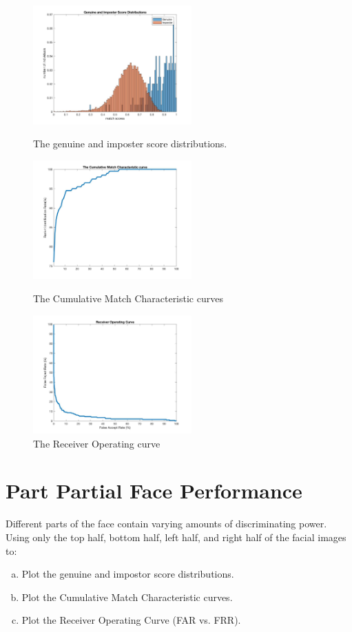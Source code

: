 \documentclass[a4paper]{article}
\begin{document}
\begin{spacing}{2.0}
	\begin{figure}[h]
	\begin{minipage}[t]{0.3\linewidth}
	\centering
	\includegraphics[width = 2.4in]{AllscoreDis.jpg}
	\caption{The genuine and imposter score distributions.}
	\label{scoreDis}
	\end{minipage}
	\begin{minipage}[t]{0.3\linewidth}
	\centering
	\includegraphics[width = 2.4in]{AllCMC.jpg}
	\caption{The Cumulative Match Characteristic curves}
	\label{CMC}
	\end{minipage}
	\begin{minipage}[t]{0.3\linewidth}
	\centering
	\includegraphics[width = 2.4in]{AllROC.jpg}
	\caption{The Receiver Operating curve}
	\label{ROC}
	\end{minipage}
	\end{figure}



	

\section*{\huge\textbf{ Part \uppercase\expandafter{} Partial Face Performance}  }
	\normalsize
	Different parts of the face contain varying amounts of discriminating power. Using only the top half, bottom half, left half, and right half of the facial images to:
	\begin{enumerate}[(a)]
	\item Plot the genuine and impostor score distributions.
	\item Plot the Cumulative Match Characteristic curves.
	\item Plot the Receiver Operating Curve (FAR vs. FRR).
	\end{enumerate}
	

\end{spacing}
\end{document}
